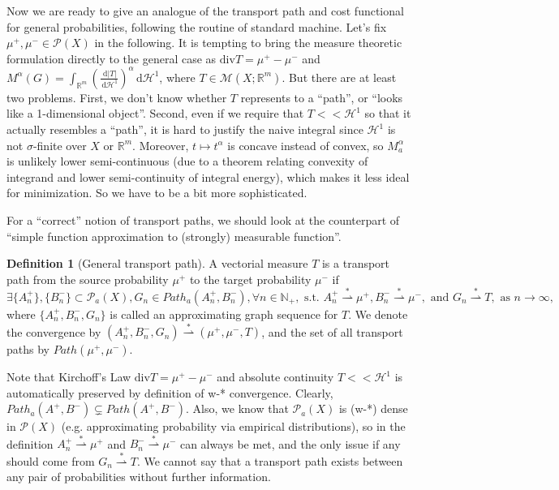 \documentclass[fleqn]{article}
\theoremstyle{definition}
\newtheorem{defn}[thm]{Definition}
\theoremstyle{remark}
\renewcommand{\d}{\,\mathrm{d}} %
\renewcommand{\P}{\mathcal{P}} %
\renewcommand{\H}{\mathcal{H}^1} %
\newcommand{\wstar}{\stackrel{*}{\rightharpoonup}} %
\begin{document}
\par
Now we are ready to give an analogue of the transport path and cost functional for general probabilities, following the routine of standard machine. Let's fix $\mu^+,\mu^- \in\P(X)$ in the following. It is tempting to bring the measure theoretic formulation directly to the general case as $\mathrm{div }T = \mu^+ - \mu^-$ and $M^\alpha(G) = \int_{\mathbb{R}^m} \left(\frac{\d|T|}{\d\H}\right)^{\alpha} \d\H$, where $T\in\mathcal{M}(X;\mathbb{R}^m)$. But there are at least two problems. First, we don't know whether $T$ represents to a ``path'', or ``looks like a 1-dimensional object''. Second, even if we require that $T<<\H$ so that it actually resembles a ``path'', it is hard to justify the naive integral since $\H$ is not $\sigma$-finite over $X$ or $\mathbb{R}^m$. Moreover, $t\mapsto t^\alpha$ is concave instead of convex, so $M_a^\alpha$ is unlikely lower semi-continuous (due to a theorem relating convexity of integrand and lower semi-continuity of integral energy), which makes it less ideal for minimization. So we have to be a bit more sophisticated.

\par
For a ``correct'' notion of transport paths, we should look at the counterpart of ``simple function approximation to (strongly) measurable function''.
\begin{defn}[General transport path]
A vectorial measure $T$ is a transport path from the source probability $\mu^+$ to the target probability $\mu^-$ if
$$\exists \{A^+_n\}, \{B^-_n\} \subset \P_a(X), G_n \in Path_a(A^+_n, B^-_n), \forall n\in\mathbb{N}_+, \textrm{ s.t. } A^+_n \wstar \mu^+, B^-_n \wstar \mu^-, \textrm{ and } G_n \wstar T, \textrm{ as } n\rightarrow \infty,$$
where $\{A^+_n, B^-_n,G_n\}$ is called an approximating graph sequence for $T$.
We denote the convergence by $(A^+_n,B^-_n,G_n)\wstar(\mu^+,\mu^-,T)$, and the set of all transport paths by $Path(\mu^+,\mu^-)$.
\end{defn}

\par
Note that Kirchoff's Law $\mathrm{div }T = \mu^+ -\mu^-$ and absolute continuity $T<<\H$ is automatically preserved by definition of w-* convergence. Clearly, $Path_a(A^+,B^-) \subsetneq Path(A^+,B^-)$. Also, we know that $\P_a(X)$ is (w-*) dense in $\P(X)$ (e.g. approximating probability via empirical distributions), so in the definition $A^+_n \wstar \mu^+$ and $B^-_n \wstar \mu^-$ can always be met, and the only issue if any should come from $G_n \wstar T$. We cannot say that a transport path exists between any pair of probabilities without further information.
\end{document}
